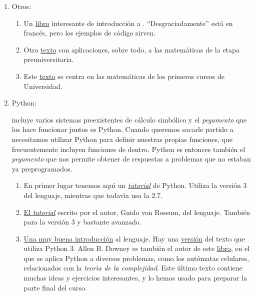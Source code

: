 \begin{enumerate}
 \item {\sc Otros:}
 \begin{enumerate}
  \item Un \href{http://150.244.21.37/PDFs/INTRO/sagebook-FR.pdf}{libro} interesante de
introducci\'on a {\sage}. ``Desgraciadamente'' est\'a en franc\'es, pero los
ejemplos de c\'odigo sirven. 
  \item  Otro \href{http://150.244.21.37/PDFs/INTRO/sage_for_newbies_v1.23.pdf}{texto} con
aplicaciones, sobre todo,  a las matem\'aticas de la etapa preuniversitaria. 

\item  Este \href{http://150.244.21.37PDFs/INTRO/sage_for_undergraduates_color.pdf}{texto} se centra en  las matem\'aticas de los primeros cursos de Universidad. 

  
 \end{enumerate}
\item {\sc Python:} 

{\sage} incluye varios sistemas preexistentes de c\'alculo simb\'olico y el
{\itshape pegamento} que los hace funcionar juntos es Python. Cuando queremos
sacarle partido a {\sage} necesitamos utilizar Python para definir nuestras
propias funciones, que frecuentemente incluyen funciones  de {\sage}
dentro. Python es entonces tambi\'en el {\itshape pegamento} que nos permite
obtener de {\sage} respuestas a problemas que no estaban ya preprogramados.

\begin{enumerate}
 \item En primer lugar tenemos aqu\'{\i} un 
\href{http://150.244.21.37/PDFs/PYTHONpython3handson.pdf}{{\itshape tutorial}} de Python.
Utiliza la versi\'on $3$ del lenguaje, mientras que {\sage} todav\'{\i}a usa la
$2.7$. 
\item \href{http://150.244.21.37/PDFs/PYTHONpythonTutorial.pdf}{El {\itshape tutorial}}
escrito por el autor, Guido van Rossum, del lenguaje. Tambi\'en para la
versi\'on $3$ y bastante avanzado. 

\item  \href{http://150.244.21.37/PDFs/PYTHONthinkpython.pdf}{Una muy buena
introducci\'on} al lenguaje. Hay  una
\href{http://150.244.21.37/PDFs/PYTHONthinkpython-3.pdf}{versi\'on} del texto  que
utiliza Python $3$. Allen B. Downey es tambi\'en el autor de este
\href{http://150.244.21.37/PDFs/PYTHONthinkcomplexity.pdf}{libro}, en el que se aplica
Python a diversos problemas, como los aut\'omatas celulares, relacionados con la
{\itshape teor\'{\i}a de la complejidad}. Este \'ultimo texto contiene muchas
ideas y ejercicios interesantes,  y lo hemos usado  para preparar la parte final
del  curso.
\end{enumerate}


\end{enumerate}
